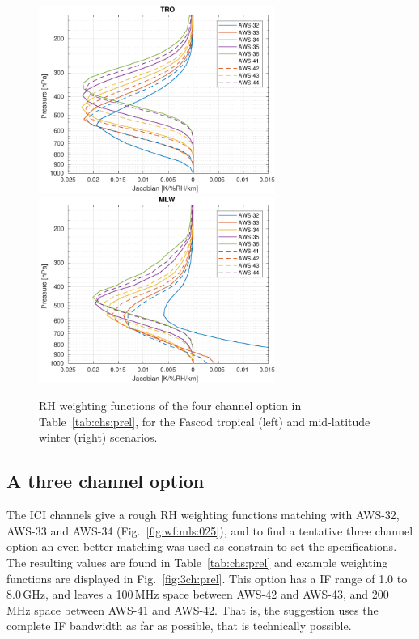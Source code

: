 \documentclass[12pt]{article}
\begin{document}
\begin{figure}[!p]
  \centering
  \includegraphics[height=61mm]{fascod_4chopt_tro}\hspace{5mm}%
  \includegraphics[clip,trim=43 0 0 0,height=61mm]{fascod_4chopt_mlw}
  \caption{RH weighting functions of the four channel option in
    Table~\ref{tab:chs:prel}, for the Fascod tropical (left) and mid-latitude
    winter (right) scenarios.}
  \label{fig:4ch:prel}
\end{figure}


\subsection{A three channel option}
%
The ICI channels give a rough RH weighting functions matching with AWS-32,
AWS-33 and AWS-34 (Fig.~\ref{fig:wf:mls:025}), and to find a tentative three
channel option an even better matching was used as constrain to set the
specifications. The resulting values are found in Table~\ref{tab:chs:prel} and
example weighting functions are displayed in Fig.~\ref {fig:3ch:prel}. This
option has a IF range of 1.0 to 8.0\,GHz, and leaves a 100\,MHz space between
AWS-42 and AWS-43, and 200\,MHz space between AWS-41 and AWS-42. That is, the
suggestion uses the complete IF bandwidth as far as possible, that is
technically possible.
\end{document}
